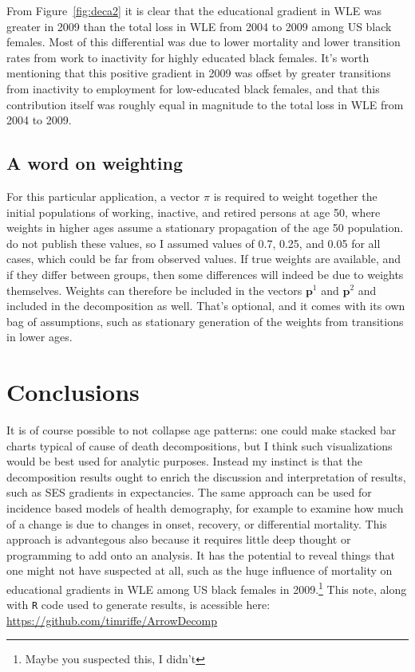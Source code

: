 \documentclass[12pt]{article}
\begin{document}
From Figure~\ref{fig:deca2} it is clear that the educational gradient in WLE was
greater in 2009 than the total loss in WLE from 2004 to 2009 among US black
females. Most of this differential was due to lower mortality and lower
transition rates from work to inactivity for highly educated black females. It's
worth mentioning that this positive gradient in 2009 was offset by greater
transitions from inactivity to employment for low-educated black females, and
that this contribution itself was roughly equal in magnitude to the total loss
in WLE from 2004 to 2009.
\FloatBarrier

\subsection{A word on weighting}
For this particular application, a vector $\pi$ is required to weight together
the initial populations of working, inactive, and retired persons at age 50,
where weights in higher ages assume a stationary propagation of the age 50
population.
\citet{Dudel2017} do not publish these values, so I assumed values of 0.7,
0.25, and 0.05 for all cases, which could be far from observed values. If true
weights are available, and if they differ between groups, then some differences
will indeed be due to weights themselves. Weights can therefore be included in
the vectors $\textbf{p}^1$ and $\textbf{p}^2$ and included in the decomposition
as well. That's optional, and it comes with its own bag of assumptions, such as
stationary generation of the weights from transitions in lower ages.

\section{Conclusions}
It is of course possible to not collapse age patterns: one could make stacked
bar charts typical of cause of death decompositions, but I think such
visualizations would be best used for analytic purposes. Instead my instinct is
that the decomposition results ought to enrich the discussion and interpretation
of results, such as SES gradients in expectancies. The same approach can be used
for incidence based models of health demography, for example to examine how much
of a change is due to changes in onset, recovery, or differential mortality.
This approach is advantegous also because it requires little deep thought or
programming to add onto an analysis. It has the potential to reveal things that
one might not have suspected at all, such as the huge influence of mortality on
educational gradients in WLE among US black females in 2009.\footnote{Maybe you
suspected this, I didn't} This note, along with \texttt{R} code used to generate
results, is acessible here:\\ \url{https://github.com/timriffe/ArrowDecomp}


\singlespacing

   
\end{document}

